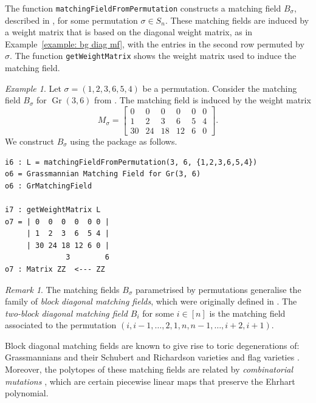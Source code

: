 \documentclass[11pt]{article}
\DeclareMathOperator{\Gr}{Gr}
\theoremstyle{plain}
\theoremstyle{definition}
\theoremstyle{remark}
\newtheorem{remark}[theorem]{Remark}
\newtheorem{example}[theorem]{Example}
\begin{document}
The function \texttt{matchingFieldFromPermutation} constructs a matching field $B_\sigma$, described in \cite{clarke2022partial}, for some permutation $\sigma \in S_n$. These matching fields are induced by a weight matrix that is based on the diagonal weight matrix, as in Example~\ref{example: bg diag mf}, with the entries in the second row permuted by $\sigma$. The function \texttt{getWeightMatrix} shows the weight matrix used to induce the matching field. 

\begin{example}
    Let $\sigma = (1,2,3,6,5,4)$ be a permutation. Consider the matching field $B_\sigma$ for $\Gr(3,6)$ from \cite{clarke2022partial}. The matching field is induced by the weight matrix
    \[
    M_\sigma = \begin{bmatrix}
        0 & 0 & 0 & 0 & 0 & 0 \\
        1 & 2 & 3 & 6 & 5 & 4 \\
        30 & 24 & 18 & 12 & 6  & 0
    \end{bmatrix}.
    \]
    We construct $B_\sigma$ using the package as follows.
\begin{lstlisting}[caption = {Matching field from a permutation}]
i6 : L = matchingFieldFromPermutation(3, 6, {1,2,3,6,5,4})
o6 = Grassmannian Matching Field for Gr(3, 6)
o6 : GrMatchingField

i7 : getWeightMatrix L
o7 = | 0  0  0  0  0 0 |
     | 1  2  3  6  5 4 |
     | 30 24 18 12 6 0 |
              3        6
o7 : Matrix ZZ  <--- ZZ
\end{lstlisting}

    
\end{example}

\begin{remark}
    The matching fields $B_\sigma$ parametrised by permutations generalise the family of \textit{block diagonal matching fields}, which were originally defined in \cite{mohammadi2019matching}. The \textit{two-block diagonal matching field $B_i$} for some $i \in [n]$ is the matching field associated to the permutation $(i, i-1, \dots, 2,1,n, n-1, \dots, i+2, i+1)$.

    
    Block diagonal matching fields are known to give rise to toric degenerations of: Grassmannians and their Schubert and Richardson varieties \cite{clarke2020schubert, bonala2021grRichardson} and flag varieties \cite{clarke2021flag}.
    Moreover, the polytopes of these matching fields are related by \textit{combinatorial mutations} \cite{clarke2021combinatorial, clarke2022partial}, which are certain piecewise linear maps that preserve the Ehrhart polynomial.
\end{remark}
\end{document}
